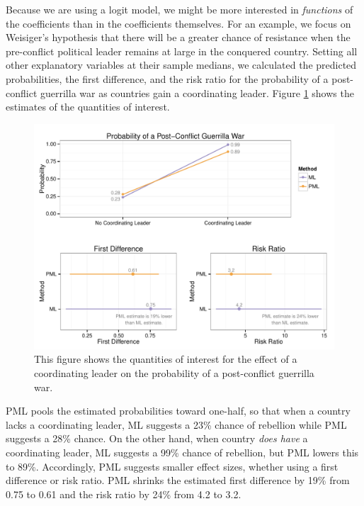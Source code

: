 \documentclass[12pt]{article}
\begin{document}
\begin{appendix}
Because we are using a logit model, we might be more interested in \textit{functions} of the coefficients than in the coefficients themselves.
For an example, we focus on Weisiger's hypothesis that there will be a greater chance of resistance when the pre-conflict political leader remains at large in the conquered country.
Setting all other explanatory variables at their sample medians, we calculated the predicted probabilities, the first difference, and the risk ratio for the probability of a post-conflict guerrilla war as countries gain a coordinating leader.
Figure \ref{fig:weisiger-qis} shows the estimates of the quantities of interest.

\begin{figure}[h]
\begin{center}
\includegraphics[width = \textwidth]{figs/weisiger-qis.pdf}
\caption{This figure shows the quantities of interest for the effect of a coordinating leader on the probability of a post-conflict guerrilla war.}\label{fig:weisiger-qis}
\end{center}
\end{figure}

PML pools the estimated probabilities toward one-half, so that when a country lacks a coordinating leader, ML suggests a 23\% chance of rebellion while PML suggests a 28\% chance.
On the other hand, when country \textit{does have} a coordinating leader, ML suggests a 99\% chance of rebellion, but PML lowers this to 89\%.
Accordingly, PML suggests smaller effect sizes, whether using a first difference or risk ratio.
PML shrinks the estimated first difference by 19\% from 0.75 to 0.61 and the risk ratio by 24\% from 4.2 to 3.2.

\end{appendix}
\end{document}
